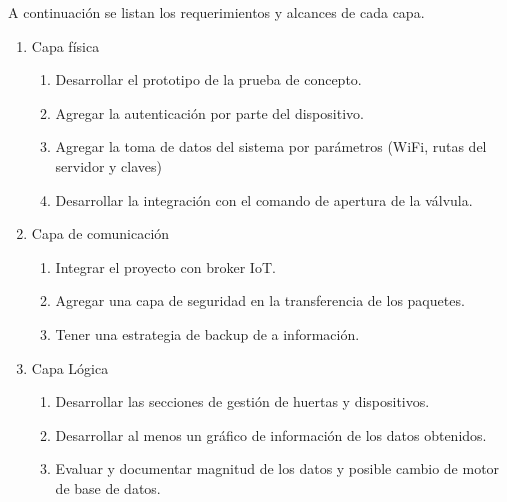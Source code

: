 A continuación se listan los requerimientos y alcances de cada capa.
\begin{enumerate}
\item Capa física
	\begin{enumerate}
		\item Desarrollar el prototipo de la prueba de concepto.
		\item Agregar la autenticación por parte del dispositivo.
		\item Agregar la toma de datos del sistema por parámetros (WiFi, rutas del servidor y claves)
		\item Desarrollar la integración con el comando de apertura de la válvula.
	\end{enumerate}
\item Capa de comunicación
	\begin{enumerate}
		\item Integrar el proyecto con broker IoT.
		\item Agregar una capa de seguridad en la transferencia de los paquetes.
		\item Tener una estrategia de backup de a información.
	\end{enumerate}
\item Capa Lógica
	\begin{enumerate}
		\item Desarrollar las secciones de gestión de huertas y dispositivos.
		\item Desarrollar al menos un gráfico de información de los datos obtenidos.
		\item Evaluar y documentar magnitud de los datos y posible cambio de motor de base de datos. 
	\end{enumerate}
\end{enumerate}

